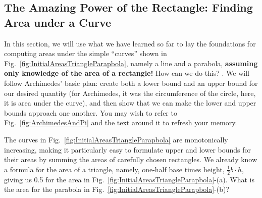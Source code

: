 \subsection{The Amazing Power of the Rectangle: Finding Area under a Curve}
\label{sec:ApproximatingAreaFiniteSumRectangles}

In this section, we will use what we have learned so far to lay the foundations for computing areas under the simple ``curves'' shown in Fig.~\ref{fig:InitialAreasTriangleParapbola}, namely a line and a parabola, \textbf{assuming only knowledge of the area of a rectangle!} How can we do this? . We will follow Archimedes' basic plan: create both a lower bound and an upper bound for our desired quantity (for Archimedes, it was the circumference of the circle, here, it is area under the curve), and then show that we can make the lower and upper bounds approach one another. You may wish to refer to Fig.~\ref{fig:ArchimedesAndPi} and the text around it to refresh your memory. 

The curves in Fig.~\ref{fig:InitialAreasTriangleParapbola} are monotonically increasing, making it particularly easy to formulate upper and lower bounds for their areas by summing the areas of carefully chosen rectangles. We already know a formula for the area of a triangle, namely, one-half base times height, $\frac{1}{2}b \cdot h$, giving us 0.5 for the area in Fig.~\ref{fig:InitialAreasTriangleParapbola}-(a). What is the area for the parabola in Fig.~\ref{fig:InitialAreasTriangleParapbola}-(b)?

